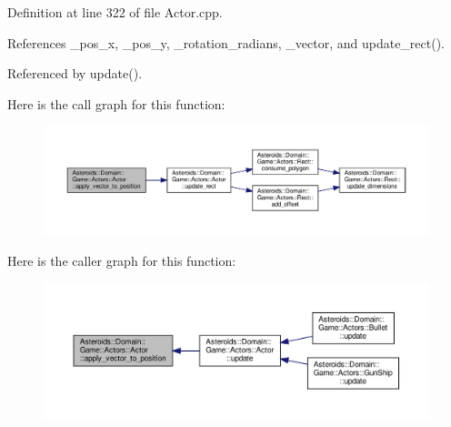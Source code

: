 Definition at line 322 of file Actor.\+cpp.



References \+\_\+pos\+\_\+x, \+\_\+pos\+\_\+y, \+\_\+rotation\+\_\+radians, \+\_\+vector, and update\+\_\+rect().



Referenced by update().

Here is the call graph for this function\+:\nopagebreak
\begin{figure}[H]
\begin{center}
\leavevmode
\includegraphics[width=350pt]{classAsteroids_1_1Domain_1_1Game_1_1Actors_1_1Actor_aafec1372aa2f5b203112aae5f6b16310_cgraph}
\end{center}
\end{figure}
Here is the caller graph for this function\+:\nopagebreak
\begin{figure}[H]
\begin{center}
\leavevmode
\includegraphics[width=350pt]{classAsteroids_1_1Domain_1_1Game_1_1Actors_1_1Actor_aafec1372aa2f5b203112aae5f6b16310_icgraph}
\end{center}
\end{figure}
\mbox{\label{classAsteroids_1_1Domain_1_1Game_1_1Actors_1_1Actor_a80d8992f00d8e0056d0287e6076c22a4}} 
